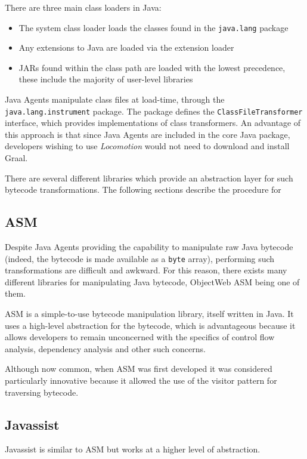	There are three main class loaders in Java:
	
	\begin{itemize}
		\item The system class loader loads the classes found in the \texttt{java.lang} package
		\item Any extensions to Java are loaded via the extension loader
		\item JARs found within the class path are loaded with the lowest precedence, these include the majority of user-level libraries
	\end{itemize}
	
	Java Agents manipulate class files at load-time, through the \texttt{java.lang.instrument} package. The package defines the \texttt{ClassFileTransformer} interface, which provides implementations of class transformers. An advantage of this approach is that since Java Agents are included in the core Java package, developers wishing to use \textit{Locomotion} would not need to download and install Graal.
	
	There are several different libraries which provide an abstraction layer for such bytecode transformations. The following sections describe the procedure for 

	\subsection{ASM} \label{sec:instrumentation/bytecode-instr/asm}
	Despite Java Agents providing the capability to manipulate raw Java bytecode (indeed, the bytecode is made available as a \texttt{byte} array), performing such transformations are difficult and awkward. For this reason, there exists many different libraries for manipulating Java bytecode, ObjectWeb ASM being one of them.
	
	ASM \citep{Bruneton2002} is a simple-to-use bytecode manipulation library, itself written in Java. It uses a high-level abstraction for the bytecode, which is advantageous because it allows developers to remain unconcerned with the specifics of control flow analysis, dependency analysis and other such concerns.
	
	Although now common, when ASM was first developed it was considered particularly innovative because it allowed the use of the visitor pattern \citep[p.~331]{Gamma1995} for traversing bytecode.

	\subsection{Javassist} \label{sec:instrumentation/alt-instr/bytecode-instr/javassist}
	Javassist is similar to ASM but works at a higher level of abstraction.
	

